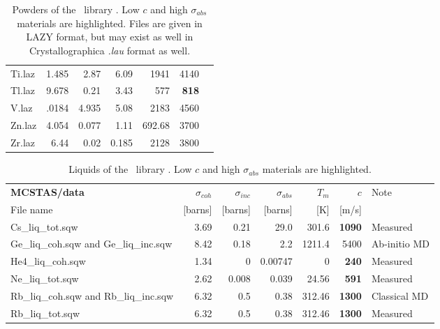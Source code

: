 \begin{table}
\begin{center}
{\begin{small}
\begin{tabular}{|l|rrr|rr|p{}|}
Ti.laz             & 1.485     & 2.87     &6.09      &1941      &4140&\\
Tl.laz             & 9.678     & 0.21     &3.43      &577       &{\bf 818}&\\
V.laz              & .0184     & 4.935    &5.08      &2183      &4560&\\
Zn.laz             & 4.054     & 0.077    &1.11      &692.68    &3700&\\
Zr.laz             & 6.44      & 0.02     &0.185     &2128      &3800&\\
      \hline
    \end{tabular}\end{small}
    \caption{Powders of the \MCS\ library \cite{icsd_ill,ILLblue}. Low $c$ and high $\sigma_{abs}$ materials are highlighted. Files are given in LAZY format, but may exist as well in Crystallographica {\it .lau} format as well.}
    \label{t:powders-data}
    }
  \end{center}
\end{table}

\begin{table}
  \begin{center}
    {\let\my=\\
    \begin{small}
    \begin{tabular}{|l|rrr|rr|p{}|}

      \hline
      {\bf MCSTAS/data} & $\sigma_{coh}$&$\sigma_{inc}$&$\sigma_{abs}$&$T_m$       & $c$    & Note \\
          File name     & [barns]     & [barns]    & [barns]    & [K]        & [m/s] & \\
      \hline
Cs\_liq\_tot.sqw                      & 3.69      & 0.21     &29.0      &301.6     &{\bf 1090}  & Measured \\
Ge\_liq\_coh.sqw and Ge\_liq\_inc.sqw & 8.42      & 0.18     &2.2       &1211.4    &5400  & Ab-initio MD \\
He4\_liq\_coh.sqw                     & 1.34      & 0        &0.00747   &0         &{\bf 240}   & Measured\\
Ne\_liq\_tot.sqw                      & 2.62      & 0.008    &0.039     &24.56     &{\bf 591}   & Measured\\
Rb\_liq\_coh.sqw and Rb\_liq\_inc.sqw & 6.32      & 0.5      &0.38      &312.46    &{\bf 1300}  & Classical MD \\
Rb\_liq\_tot.sqw                      & 6.32      & 0.5      &0.38      &312.46    &{\bf 1300}  & Measured \\
      \hline
    \end{tabular}\end{small}
    \caption{Liquids of the \MCS\ library \cite{icsd_ill,ILLblue}. Low $c$ and high $\sigma_{abs}$ materials are highlighted.}
    \label{t:liquids-data}
    }
  \end{center}
\end{table}

